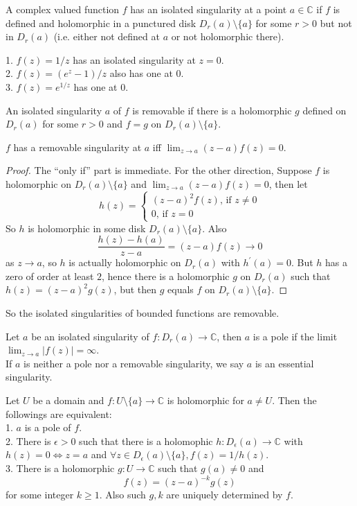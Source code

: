 \begin{definition}
    A complex valued function $f$ has an isolated singularity at a point $a\in\mathbb C$ if $f$ is defined and holomorphic in a punctured disk $D_r(a)\setminus\{a\}$ for some $r>0$ but not in $D_r(a)$ (i.e. either not defined at $a$ or not holomorphic there).
\end{definition}
\begin{example}
    1. $f(z)=1/z$ has an isolated singularity at $z=0$.\\
    2. $f(z)=(e^z-1)/z$ also has one at $0$.\\
    3. $f(z)=e^{1/z}$ has one at $0$.
\end{example}
\begin{definition}
    An isolated singularity $a$ of $f$ is removable if there is a holomorphic $g$ defined on $D_r(a)$ for some $r>0$ and $f=g$ on $D_r(a)\setminus\{a\}$.
\end{definition}
\begin{proposition}
    $f$ has a removable singularity at $a$ iff $\lim_{z\to a}(z-a)f(z)=0$.
\end{proposition}
\begin{proof}
    The ``only if'' part is immediate.
    For the other direction, Suppose $f$ is holomorphic on $D_r(a)\setminus\{a\}$ and $\lim_{z\to a}(z-a)f(z)=0$, then let
    $$h(z)=\begin{cases}
        (z-a)^2f(z)\text{, if $z\neq 0$}\\
        0\text{, if $z=0$}
    \end{cases}$$
    So $h$ is holomorphic in some disk $D_r(a)\setminus\{a\}$.
    Also
    $$\frac{h(z)-h(a)}{z-a}=(z-a)f(z)\to 0$$
    as $z\to a$, so $h$ is actually holomorphic on $D_r(a)$ with $h^\prime(a)=0$.
    But $h$ has a zero of order at least $2$, hence there is a holomorphic $g$ on $D_r(a)$ such that $h(z)=(z-a)^2g(z)$, but then $g$ equals $f$ on $D_r(a)\setminus\{a\}$.
\end{proof}
So the isolated singularities of bounded functions are removable.
\begin{definition}
    Let $a$ be an isolated singularity of $f:D_r(a)\to\mathbb C$, then $a$ is a pole if the limit $\lim_{z\to a}|f(z)|=\infty$.\\
    If $a$ is neither a pole nor a removable singularity, we say $a$ is an essential singularity.
\end{definition}
\begin{proposition}\label{pole_equiv}
    Let $U$ be a domain and $f:U\setminus\{a\}\to\mathbb C$ is holomorphic for $a\neq U$.
    Then the followings are equivalent:\\
    1. $a$ is a pole of $f$.\\
    2. There is $\epsilon>0$ such that there is a holomophic $h:D_\epsilon(a)\to\mathbb C$ with $h(z)=0\iff z=a$ and $\forall z\in D_\epsilon(a)\setminus\{a\},f(z)=1/h(z)$.\\
    3. There is a holomorphic $g:U\to\mathbb C$ such that $g(a)\neq 0$ and
    $$f(z)=(z-a)^{-k}g(z)$$
    for some integer $k\ge 1$.
    Also such $g,k$ are uniquely determined by $f$.
\end{proposition}
